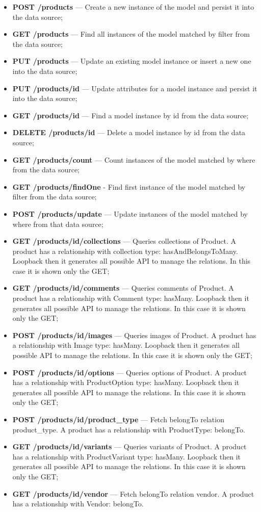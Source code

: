 \begin{itemize}
\item \textbf{POST /products} — Create a new instance of the model and persist it into the data source;
\item \textbf{GET /products} —  Find all instances of the model matched by filter from the data source;
\item \textbf{PUT /products} — Update an existing model instance or insert a new one into the data source;
\item \textbf{PUT /products/id} — Update attributes for a model instance and persist it into the data source;
\item \textbf{GET /products/id} — Find a model instance by id from the data source;
\item \textbf{DELETE /products/id} — Delete a model instance by id from the data source;
\item \textbf{GET  /products/count} — Count instances of the model matched by where from the data source;
\item \textbf{GET /products/findOne}  - Find first instance of the model matched by filter from the data source;
\item \textbf{POST /products/update} — Update instances of the model matched by where from that data source;
\item \textbf{GET /products/id/collections} — Queries collections of Product. A product has a relationship with collection type: hasAndBelongsToMany. Loopback then it generates all possible API to manage the relations. In this case it is shown only the GET;
\item \textbf{GET  /products/id/comments} — Queries comments of Product. A product has a relationship with Comment type: hasMany. Loopback then it generates all possible API to manage the relations. In this case it is shown only the GET;
\item \textbf{POST /products/id/images} — Queries images of Product. A product has a relationship with Image type: hasMany. Loopback then it generates all possible API to manage the relations. In this case it is shown only the GET;
\item \textbf{POST /products/id/options} — Queries options of Product. A product has a relationship with ProductOption type: hasMany. Loopback then it generates all possible API to manage the relations. In this case it is shown only the GET;
\item \textbf{POST /products/id/product\_type} — Fetch belongTo relation product\_type. A product has a relationship with ProductType: belongTo.
\item \textbf{GET  /products/id/variants} — Queries variants of Product. A product has a relationship with ProductVariant type: hasMany. Loopback then it generates all possible API to manage the relations. In this case it is shown only the GET;
\item \textbf{GET /products/id/vendor} — Fetch belongTo relation vendor. A product has a relationship with Vendor: belongTo.
\end{itemize}
